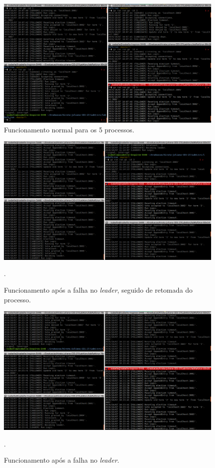 \documentclass[journal,onecolumn]{IEEEtran}
\begin{document}
\begin{figure}[H]
\centering
\centerline{\includegraphics[scale=0.4]{imagens/funcionamento_normal.png}}
\caption{Funcionamento normal para os 5 processos.}
\label{funcionamento_normal}
\end{figure}

\begin{figure}[H]
\centering
\centerline{\includegraphics[scale=0.4]{imagens/falha_no_lider.png}}
\caption{Funcionamento após a falha no \textit{leader}, seguido de retomada do processo.}.
\label{falha_no_lider}
\end{figure}

\begin{figure}[H]
\centering
\centerline{\includegraphics[scale=0.4]{imagens/1_falha.png}}
\caption{Funcionamento após a falha no \textit{leader}.}.
\label{1_falha}
\end{figure}
\end{document}

